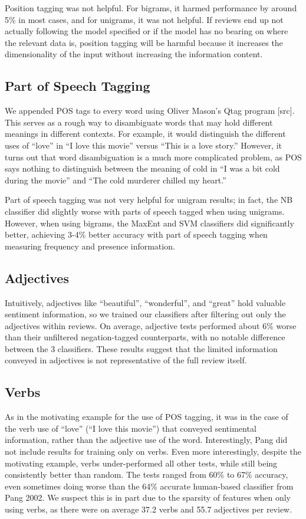 \documentclass[10pt,twocolumn,letterpaper]{article}
\begin{document}
Position tagging was not helpful. For bigrams, it harmed performance by around 5\% in most cases, and for unigrams, it was not helpful. If reviews end up not actually following the model specified or if the model has no bearing on where the relevant data is, position tagging will be harmful because it increases the dimensionality of the input without increasing the information content.

\subsection{Part of Speech Tagging}
We appended POS tags to every word using Oliver Mason’s Qtag program [src]. This serves as a rough way to disambiguate words that may hold different meanings in different contexts. For example, it would distinguish the different uses of “love” in ``I love this movie'' versus ``This is a love story.'' However, it turns out that word disambiguation is a much more complicated problem, as POS says nothing to distinguish between the meaning of cold in ``I was a bit cold during the movie'' and ``The cold murderer chilled my heart.''

Part of speech tagging was not very helpful for unigram results; in fact, the NB classifier did slightly worse with parts of speech tagged when using unigrams. However, when using bigrams, the MaxEnt and SVM classifiers did significantly better, achieving 3-4\% better accuracy with part of speech tagging when measuring frequency and presence information.

\subsection{Adjectives}
Intuitively, adjectives like ``beautiful'', ``wonderful'', and ``great'' hold valuable sentiment information, so we trained our classifiers after filtering out only the adjectives within reviews. On average, adjective tests performed about 6\% worse than their unfiltered negation-tagged counterparts, with no notable difference between the 3 classifiers. These results suggest that the limited information conveyed in adjectives is not representative of the full review itself.

\subsection{Verbs}
As in the motivating example for the use of POS tagging, it was in the case of the verb use of ``love'' (``I love this movie'') that conveyed sentimental information, rather than the adjective use of the word. Interestingly, Pang did not include results for training only on verbs. Even more interestingly, despite the motivating example, verbs under-performed all other tests, while still being consistently better than random. The tests ranged from 60\% to 67\% accuracy, even sometimes doing worse than the 64\% accurate human-based classifier from Pang 2002. We suspect this is in part due to the sparsity of features when only using verbs, as there were on average 37.2 verbs and 55.7 adjectives per review.
\end{document}

